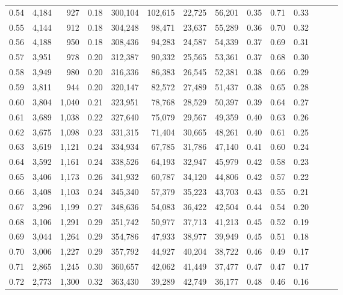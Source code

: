 \begin{tabular}{rrrrrrrrrrrrrr}
0.54 &  4,184 &    927 &  0.18 &  300,104 &  102,615 &  22,725 &  56,201 &  0.35 &  0.71 &      0.33 \\
0.55 &  4,144 &    912 &  0.18 &  304,248 &   98,471 &  23,637 &  55,289 &  0.36 &  0.70 &      0.32 \\
0.56 &  4,188 &    950 &  0.18 &  308,436 &   94,283 &  24,587 &  54,339 &  0.37 &  0.69 &      0.31 \\
0.57 &  3,951 &    978 &  0.20 &  312,387 &   90,332 &  25,565 &  53,361 &  0.37 &  0.68 &      0.30 \\
0.58 &  3,949 &    980 &  0.20 &  316,336 &   86,383 &  26,545 &  52,381 &  0.38 &  0.66 &      0.29 \\
0.59 &  3,811 &    944 &  0.20 &  320,147 &   82,572 &  27,489 &  51,437 &  0.38 &  0.65 &      0.28 \\
0.60 &  3,804 &  1,040 &  0.21 &  323,951 &   78,768 &  28,529 &  50,397 &  0.39 &  0.64 &      0.27 \\
0.61 &  3,689 &  1,038 &  0.22 &  327,640 &   75,079 &  29,567 &  49,359 &  0.40 &  0.63 &      0.26 \\
0.62 &  3,675 &  1,098 &  0.23 &  331,315 &   71,404 &  30,665 &  48,261 &  0.40 &  0.61 &      0.25 \\
0.63 &  3,619 &  1,121 &  0.24 &  334,934 &   67,785 &  31,786 &  47,140 &  0.41 &  0.60 &      0.24 \\
0.64 &  3,592 &  1,161 &  0.24 &  338,526 &   64,193 &  32,947 &  45,979 &  0.42 &  0.58 &      0.23 \\
0.65 &  3,406 &  1,173 &  0.26 &  341,932 &   60,787 &  34,120 &  44,806 &  0.42 &  0.57 &      0.22 \\
0.66 &  3,408 &  1,103 &  0.24 &  345,340 &   57,379 &  35,223 &  43,703 &  0.43 &  0.55 &      0.21 \\
0.67 &  3,296 &  1,199 &  0.27 &  348,636 &   54,083 &  36,422 &  42,504 &  0.44 &  0.54 &      0.20 \\
0.68 &  3,106 &  1,291 &  0.29 &  351,742 &   50,977 &  37,713 &  41,213 &  0.45 &  0.52 &      0.19 \\
0.69 &  3,044 &  1,264 &  0.29 &  354,786 &   47,933 &  38,977 &  39,949 &  0.45 &  0.51 &      0.18 \\
0.70 &  3,006 &  1,227 &  0.29 &  357,792 &   44,927 &  40,204 &  38,722 &  0.46 &  0.49 &      0.17 \\
0.71 &  2,865 &  1,245 &  0.30 &  360,657 &   42,062 &  41,449 &  37,477 &  0.47 &  0.47 &      0.17 \\
0.72 &  2,773 &  1,300 &  0.32 &  363,430 &   39,289 &  42,749 &  36,177 &  0.48 &  0.46 &      0.16 \\

\end{tabular}
